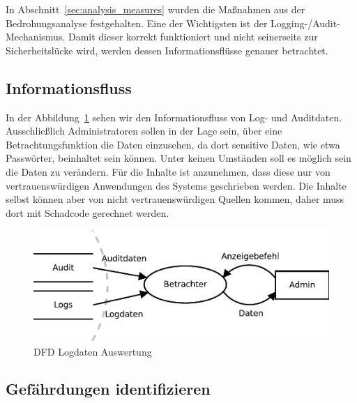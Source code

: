 \documentclass[11pt,a4paper]{report}
\begin{document}
In Abschnitt~\ref{sec:analysis_measures} wurden die Maßnahmen aus der Bedrohungsanalyse festgehalten. Eine der Wichtigsten ist der Logging-/Audit-Mechanismus. Damit dieser korrekt funktioniert und nicht seinerseits zur Sicherheitslücke wird, werden dessen Informationsflüsse genauer betrachtet.

\subsection{Informationsfluss}

In der Abbildung~\ref{fig:dfd_logs} sehen wir den Informationsfluss von Log- und Auditdaten. Ausschließlich Administratoren sollen in der Lage sein, über eine  Betrachtungsfunktion die Daten einzusehen, da dort sensitive Daten, wie etwa Passwörter, beinhaltet sein können. Unter keinen Umständen soll es möglich sein die Daten zu verändern. Für die Inhalte ist anzunehmen, dass diese nur von vertrauenswürdigen Anwendungen des Systems geschrieben werden. Die Inhalte selbst können aber von nicht vertrauenswürdigen Quellen kommen, daher muss dort mit Schadcode gerechnet werden.

\begin{figure}[htbp]
\centering
\includegraphics[scale=0.7]{images/dfd_logs.pdf}
\caption{DFD Logdaten Auswertung}
\label{fig:dfd_logs}
\end{figure}

\subsection{Gefährdungen identifizieren}
\end{document}
